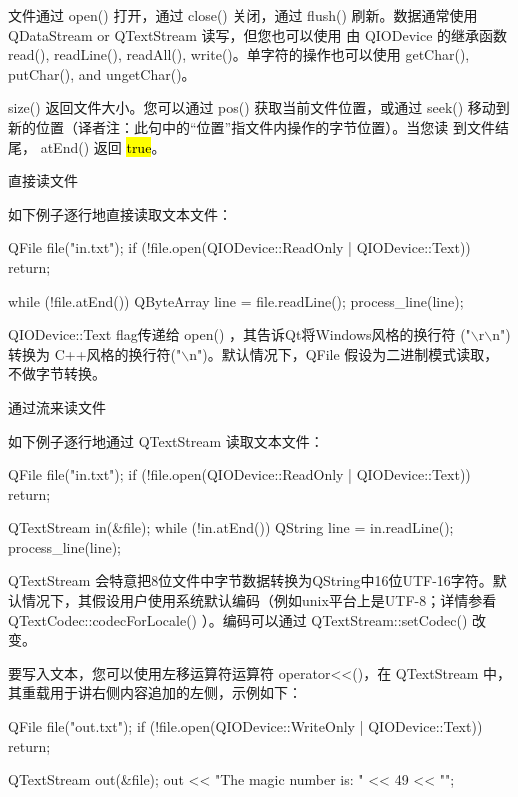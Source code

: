 文件通过 open() 打开，通过 close() 关闭，通过 flush() 刷新。数据通常使用 QDataStream or QTextStream 读写，但您也可以使用 由 QIODevice 的继承函数 read(), readLine(), readAll(), write()。单字符的操作也可以使用 getChar(), putChar(), and ungetChar()。

size() 返回文件大小。您可以通过 pos() 获取当前文件位置，或通过 seek()
移动到新的位置（译者注：此句中的“位置”指文件内操作的字节位置）。当您读
到文件结尾， atEnd() 返回 \hl{true}。

直接读文件

如下例子逐行地直接读取文本文件：

\begin{cppcode}
QFile file("in.txt");
if (!file.open(QIODevice::ReadOnly | QIODevice::Text))
    return;

while (!file.atEnd()) {
     QByteArray line = file.readLine();
     process_line(line);
}
\end{cppcode}

QIODevice::Text flag传递给 open() ，其告诉Qt将Windows风格的换行符
("$\backslash$r$\backslash$n") 转换为 C++风格的换行符("$\backslash$n")。默认情况下，QFile 假设为二进制模式读取，不做字节转换。

通过流来读文件

如下例子逐行地通过 QTextStream 读取文本文件：

\begin{cppcode}
    QFile file("in.txt");
    if (!file.open(QIODevice::ReadOnly | QIODevice::Text))
        return;

    QTextStream in(&file);
    while (!in.atEnd()) {
        QString line = in.readLine();
        process_line(line);
    }
\end{cppcode}

QTextStream 会特意把8位文件中字节数据转换为QString中16位UTF-16字符。默认情况下，其假设用户使用系统默认编码（例如unix平台上是UTF-8；详情参看 QTextCodec::codecForLocale() ）。编码可以通过 QTextStream::setCodec() 改变。

要写入文本，您可以使用左移运算符运算符 operator<<()，在 QTextStream 中，
其重载用于讲右侧内容追加的左侧，示例如下：

\begin{cppcode}
    QFile file("out.txt");
    if (!file.open(QIODevice::WriteOnly | QIODevice::Text))
        return;

    QTextStream out(&file);
    out << "The magic number is: " << 49 << "\n";

\end{cppcode}

